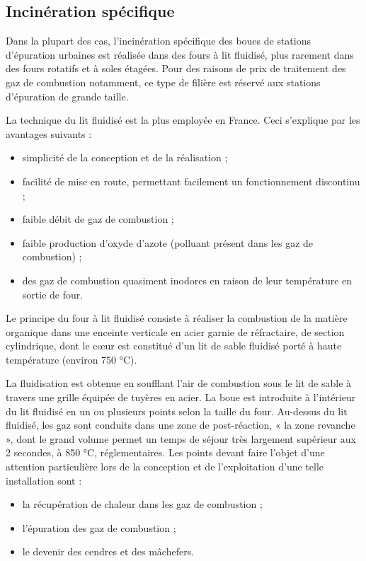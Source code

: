 \subsection{Incinération spécifique}

Dans la plupart des cas, l’incinération spécifique des boues de stations d’épuration urbaines est réalisée dans des fours à lit fluidisé, plus rarement dans des fours rotatifs et à soles étagées. Pour des raisons de prix de traitement des gaz de combustion notamment, ce type de filière est réservé aux stations d’épuration de grande taille.

La technique du lit fluidisé est la plus employée en France. Ceci s’explique par les avantages suivants :
\begin{itemize}
\item simplicité de la conception et de la réalisation ;
\item  facilité de mise en route, permettant facilement un fonctionnement discontinu ;
\item  faible débit de gaz de combustion ;
\item faible production d’oxyde d’azote (polluant présent dans les gaz de combustion) ;
\item  des gaz de combustion quasiment inodores en raison de leur température en sortie de four.
\end{itemize}


Le principe du four à lit fluidisé consiste à réaliser la combustion de la matière organique dans une enceinte verticale en acier garnie de réfractaire, de section cylindrique, dont le cœur est constitué d’un lit de sable fluidisé porté à haute température (environ 750 °C).
\vspace{0.3cm}

La fluidisation est obtenue en soufflant l’air de combustion sous le lit de sable à travers une grille équipée de tuyères en acier. La boue est introduite à l’intérieur du lit fluidisé en un ou plusieurs points selon la taille du four. Au-dessus du lit fluidisé, les gaz sont conduits dans une zone de post-réaction, « la zone revanche », dont le grand volume permet un temps de séjour très largement supérieur aux 2 secondes, à 850 °C, réglementaires.
Les points devant faire l’objet d’une attention particulière lors de la conception et de l’exploitation d’une telle installation sont :

\begin{itemize}
\item la récupération de chaleur dans les gaz de combustion ;
\item  l’épuration des gaz de combustion ;
\item  le devenir des cendres et des mâchefers.
\end{itemize}

